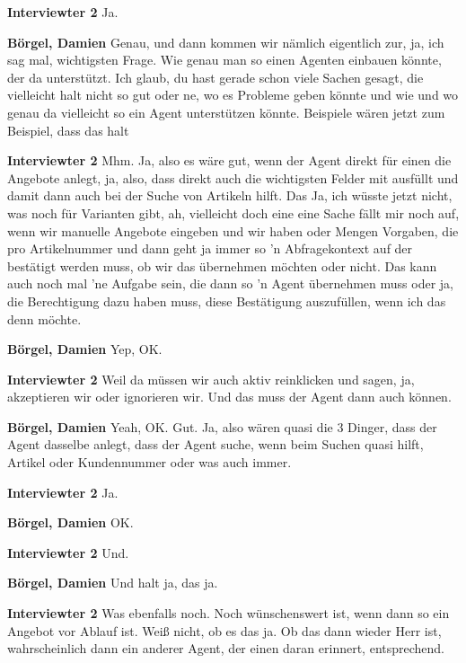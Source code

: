 \textbf{Interviewter 2}\newline
Ja.

\textbf{Börgel, Damien}\newline
Genau, und dann kommen wir nämlich eigentlich zur, ja, ich sag mal, wichtigsten Frage. Wie genau man so einen Agenten einbauen könnte, der da unterstützt. Ich glaub, du hast gerade schon viele Sachen gesagt, die vielleicht halt nicht so gut oder ne, wo es Probleme geben könnte und wie und wo genau da vielleicht so ein Agent unterstützen könnte. Beispiele wären jetzt zum Beispiel, dass das halt

\textbf{Interviewter 2}\newline
Mhm.
Ja, also es wäre gut, wenn der Agent direkt für einen die Angebote anlegt, ja, also, dass direkt auch die wichtigsten Felder mit ausfüllt und damit dann auch bei der Suche von Artikeln hilft.
Das
Ja, ich wüsste jetzt nicht, was noch für Varianten gibt, ah, vielleicht doch eine eine Sache fällt mir noch auf, wenn wir manuelle Angebote eingeben und wir haben oder Mengen Vorgaben, die pro Artikelnummer und dann geht ja immer so 'n Abfragekontext auf der bestätigt werden muss, ob wir das übernehmen möchten oder nicht. Das kann auch noch mal 'ne Aufgabe sein, die dann so 'n Agent übernehmen muss oder ja, die Berechtigung dazu haben muss, diese Bestätigung auszufüllen, wenn ich das denn möchte.

\textbf{Börgel, Damien}\newline
Yep, OK.

\textbf{Interviewter 2}\newline
Weil da müssen wir auch aktiv reinklicken und sagen, ja, akzeptieren wir oder ignorieren wir. Und das muss der Agent dann auch können.

\textbf{Börgel, Damien}\newline
Yeah, OK.
Gut.
Ja, also wären quasi die 3 Dinger, dass der Agent dasselbe anlegt, dass der Agent suche, wenn beim Suchen quasi hilft, Artikel oder Kundennummer oder was auch immer.

\textbf{Interviewter 2}\newline
Ja.

\textbf{Börgel, Damien}\newline
OK.

\textbf{Interviewter 2}\newline
Und.

\textbf{Börgel, Damien}\newline
Und halt ja, das ja.

\textbf{Interviewter 2}\newline
Was ebenfalls noch.
Noch wünschenswert ist, wenn dann so ein Angebot vor Ablauf ist.
Weiß nicht, ob es das ja.
Ob das dann wieder Herr ist, wahrscheinlich dann ein anderer Agent, der einen daran erinnert, entsprechend.

